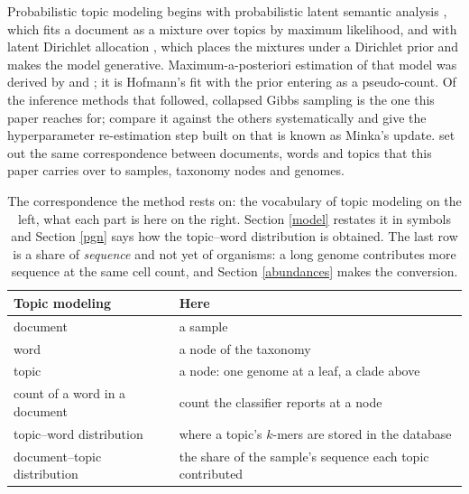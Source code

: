 \documentclass[pdflatex,sn-vancouver-num]{sn-jnl}
\begin{document}
    Probabilistic topic modeling begins with probabilistic latent semantic analysis
    \citep{hofmann1999plsa}, which fits a document as a mixture over topics by maximum likelihood,
    and with latent Dirichlet allocation \citep{blei2003lda}, which places the mixtures under a
    Dirichlet prior and makes the model generative. Maximum-a-posteriori estimation of that model was
    derived by \citet{defreitas2001bayesian} and \citet{chien2008adaptive}; it is Hofmann's fit with
    the prior entering as a pseudo-count. Of the inference methods that followed, collapsed Gibbs sampling
    \citep{griffiths2004scientific} is the one this paper reaches for; \citet{asuncion2009smoothing}
    compare it against the others systematically and give the hyperparameter re-estimation step built
    on \citet{minka2000dirichlet} that is known as Minka's update.
    \citet{pfeifer2019topicgrouper} set out the same correspondence between documents, words and
    topics that this paper carries over to samples, taxonomy nodes and genomes.

    \begin{table}[!htbp]
        \centering
        \footnotesize
        \begin{tabular}{@{}l|l@{}}
            \textbf{Topic modeling} & \textbf{Here}\\
            \hline
            document & a sample\\
            word & a node of the taxonomy\\
            topic & a node: one genome at a leaf, a clade above\\
            count of a word in a document & count the classifier reports at a node\\
            topic--word distribution & where a topic's $k$-mers are stored in the database\\
            document--topic distribution & the share of the sample's sequence each topic contributed\\
        \end{tabular}
        \caption{The correspondence the method rests on: the vocabulary of topic modeling on the
        left, what each part is here on the right. Section \ref{model} restates it in symbols and
        Section \ref{pgn} says how the topic--word distribution is obtained. The last row is a share
        of \emph{sequence} and not yet of organisms: a long genome contributes more sequence at the
        same cell count, and Section \ref{abundances} makes the conversion.}\label{correspondence}
    \end{table}
\end{document}
